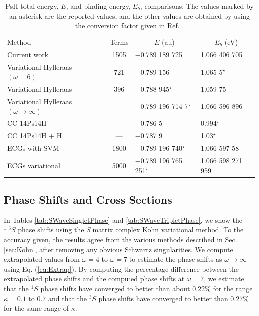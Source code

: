 \documentclass[preprint,showpacs,showkeys,preprintnumbers,amsmath,amssymb,longbibliography,pra,aps]{revtex4-1}
\newcommand*{\thead}[1]{\multicolumn{1}{c}{#1}}
\begin{document}
\squeezetable  %
\begin{table}
\begin{center}
\begin{ruledtabular}  %
\begin{tabular}{l c l l}
Method & Terms & \thead{$E$ (au)} & \thead{$E_b$ (eV)}\\
\colrule
Current work & 1505 & $-$0.789 189 725 & 1.066 406 705 \\
Variational Hylleraas $(\omega = 6)$ \cite{VanReeth2003} & 721 & $-$0.789 156 & 1.065 5$^\star$ \\
Variational Hylleraas \cite{Ho1986} & 396 & $-$0.788 945$^\star$ & 1.059 75 \\
Variational Hylleraas $(\omega \rightarrow \infty)$ \cite{Yan1999} & --- & $-$0.789 196 714 7$^\star$ & 1.066 596 896 \\
CC 14Ps14H \cite{Blackwood2002} & --- & $-$0.786 5 & 0.994$^\star$ \\
CC 14Ps14H + $\text{H}^-$ \cite{Walters2004} & --- & $-$0.787 9 & 1.03$^\star$\\
ECGs with SVM \cite{Mitroy2006} & 1800 & $-$0.789 196 740$^\star$ & 1.066 597 58 \\
ECGs variational \cite{Bubin2006} & 5000 & $-$0.789 196 765 251$^\star$ & 1.066 598 271 959 \\
\end{tabular}
\end{ruledtabular}
\caption{PsH total energy, $E$, and binding energy, $E_b$, comparisons.
The values marked by an asterisk are the
reported values, and the other values are obtained by using the conversion
factor given in Ref. \cite{Mohr2012,*NISTConversions}.}
\label{tab:BoundEnergy}
\end{center}
\end{table}

\subsection{Phase Shifts and Cross Sections}

In Tables \ref{tab:SWaveSingletPhase} and \ref{tab:SWaveTripletPhase}, we 
show the $^{1,3}S$ phase shifts using the \emph{S} matrix complex Kohn 
variational method. To the accuracy given, the results agree from the various 
methods described in Sec. \ref{sec:Kohn}, after removing any obvious Schwartz 
singularities. We compute extrapolated values from $\omega = 4$ to
$\omega = 7$
to estimate the phase shifts as $\omega \rightarrow \infty$ using Eq.
(\ref{eq:Extrap}). By computing the percentage difference between the extrapolated 
phase shifts and the computed phase shifts at $\omega=7$, we estimate that 
the $^1S$ phase shifts have converged to better than about $0.22\%$ for the 
range $\kappa=0.1$ to $0.7$ and that the $^3S$ phase shifts have converged to 
better than $0.27\%$ for the same range of $\kappa$.
\end{document}
